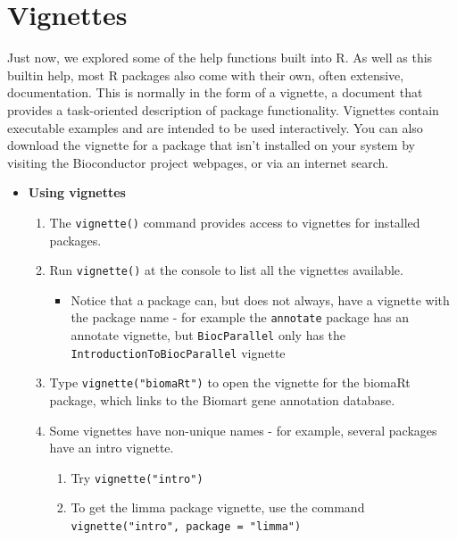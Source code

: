 \documentclass[a4paper]{book}
\providecommand{\tightlist}{%
  \setlength{\itemsep}{0pt}\setlength{\parskip}{0pt}}
\newenvironment{rmdblock}[1]
  {\vspace{1.5em}\begin{shaded*}
  \begin{itemize}
  \renewcommand{\labelitemi}{
    \raisebox{-.7\height}[0pt][0pt]{
      {\setkeys{Gin}{width=3em,keepaspectratio}\texttt{[image: images/\#1]}}
    }
  }
  \item
  }
  {
  \end{itemize}
  \end{shaded*}
  }
\newenvironment{rmdexercise}
  {\begin{rmdblock}{exercise}}
  {\end{rmdblock}}
\begin{document}
\section{Vignettes}\label{vignettes}

Just now, we explored some of the help functions built into R. As well
as this builtin help, most R packages also come with their own, often
extensive, documentation. This is normally in the form of a vignette, a
document that provides a task-oriented description of package
functionality. Vignettes contain executable examples and are intended to
be used interactively. You can also download the vignette for a package
that isn't installed on your system by visiting the Bioconductor project
webpages, or via an internet search.

\begin{rmdexercise}
\textbf{Using vignettes}

\begin{enumerate}
\def\labelenumi{\arabic{enumi}.}
\item
  The \texttt{vignette()} command provides access to vignettes for
  installed packages.
\item
  Run \texttt{vignette()} at the console to list all the vignettes
  available.

  \begin{itemize}
  \tightlist
  \item
    Notice that a package can, but does not always, have a vignette with
    the package name - for example the \texttt{annotate} package has an
    annotate vignette, but \texttt{BiocParallel} only has the
    \texttt{IntroductionToBiocParallel} vignette
  \end{itemize}
\item
  Type \texttt{vignette("biomaRt")} to open the vignette for the biomaRt
  package, which links to the Biomart gene annotation database.
\item
  Some vignettes have non-unique names - for example, several packages
  have an intro vignette.

  \begin{enumerate}
  \def\labelenumii{\alph{enumii})}
  \tightlist
  \item
    Try \texttt{vignette("intro")}
  \item
    To get the limma package vignette, use the command
    \texttt{vignette("intro",\ package\ =\ "limma")}
  \end{enumerate}
\end{enumerate}
\end{rmdexercise}
\end{document}
